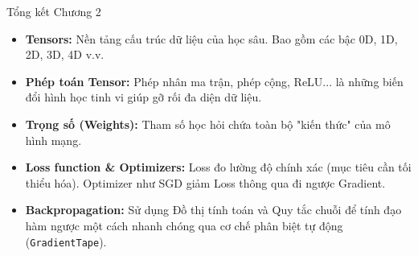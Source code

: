 \documentclass[aspectratio=169]{beamer}
\begin{document}
\begin{frame}{Tổng kết Chương 2}
    \begin{itemize}
        \item \textbf{Tensors:} Nền tảng cấu trúc dữ liệu của học sâu. Bao gồm các bậc 0D, 1D, 2D, 3D, 4D v.v.
        \item \textbf{Phép toán Tensor:} Phép nhân ma trận, phép cộng, ReLU... là những biến đổi hình học tinh vi giúp gỡ rối đa diện dữ liệu.
        \item \textbf{Trọng số (Weights):} Tham số học hỏi chứa toàn bộ "kiến thức" của mô hình mạng.
        \item \textbf{Loss function \& Optimizers:} Loss đo lường độ chính xác (mục tiêu cần tối thiểu hóa). Optimizer như SGD giảm Loss thông qua đi ngược Gradient.
        \item \textbf{Backpropagation:} Sử dụng Đồ thị tính toán và Quy tắc chuỗi để tính đạo hàm ngược một cách nhanh chóng qua cơ chế phân biệt tự động (\texttt{GradientTape}).
    \end{itemize}
\end{frame}
\end{document}

